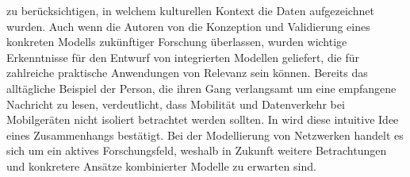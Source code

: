\documentclass[12pt, a4paper]{article}
\begin{document}
zu berücksichtigen, in welchem kulturellen Kontext die Daten aufgezeichnet wurden.\newline
Auch wenn die Autoren von \cite{Alipour2018} die Konzeption und Validierung eines konkreten Modells
zukünftiger Forschung überlassen, wurden wichtige Erkenntnisse für den Entwurf von integrierten Modellen
geliefert, die für zahlreiche praktische Anwendungen von Relevanz sein können.
Bereits das alltägliche Beispiel der Person, die ihren Gang verlangsamt um eine empfangene Nachricht zu lesen,
verdeutlicht, dass Mobilität und Datenverkehr bei Mobilgeräten nicht isoliert betrachtet werden sollten.
In \cite{Alipour2018} wird diese intuitive Idee eines Zusammenhangs bestätigt. Bei der Modellierung von Netzwerken
handelt es sich um ein aktives Forschungsfeld, weshalb in Zukunft weitere Betrachtungen und konkretere Ansätze
kombinierter Modelle zu erwarten sind.

\vfill
\pagebreak


%


\vfill
\pagebreak
\end{document}
